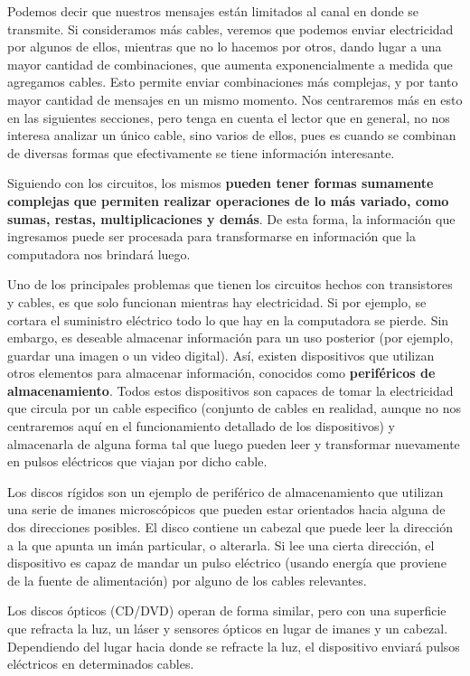 Podemos decir que nuestros mensajes están limitados al canal en donde se transmite.
Si consideramos más cables, veremos que podemos enviar electricidad por algunos
de ellos, mientras que no lo hacemos por otros, dando lugar a una mayor cantidad
de combinaciones, que aumenta exponencialmente a medida que agregamos cables. Esto
permite enviar combinaciones más complejas, y por tanto mayor cantidad de mensajes
en un mismo momento. Nos centraremos más en esto en las siguientes secciones, pero
tenga en cuenta el lector que en general, no nos interesa analizar un único cable,
sino varios de ellos, pues es cuando se combinan de diversas formas que efectivamente
se tiene información interesante. 

Siguiendo con los circuitos, los mismos \textbf{pueden tener formas sumamente
complejas que permiten realizar operaciones de lo más variado, como sumas,
restas, multiplicaciones y demás}. De esta forma, la información que ingresamos
puede ser procesada para transformarse en información que la computadora nos
brindará luego.\autocite[cap. 1]{nisan_2005}

Uno de los principales problemas que tienen los circuitos hechos con transistores
y cables, es que solo funcionan mientras hay electricidad. Si por ejemplo, se
cortara el suministro eléctrico todo lo que hay en la computadora se pierde.
Sin embargo, es deseable almacenar información para un uso posterior (por
ejemplo, guardar una imagen o un video digital). Así, existen dispositivos que
utilizan otros elementos para almacenar información, conocidos como
\textbf{periféricos de almacenamiento}. Todos estos dispositivos son capaces
de tomar la electricidad que circula por un cable especifico (conjunto de cables
en realidad, aunque no nos centraremos aquí en el funcionamiento detallado de
los dispositivos) y almacenarla de alguna forma tal que luego pueden leer y
transformar nuevamente en pulsos eléctricos que viajan por dicho cable.

Los discos rígidos son un ejemplo de periférico de almacenamiento que utilizan
una serie de imanes microscópicos que pueden estar orientados hacia alguna de
dos direcciones posibles. El disco contiene un cabezal que puede leer la
dirección a la que apunta un imán particular, o alterarla. Si lee una cierta
dirección, el dispositivo es capaz de mandar un pulso eléctrico (usando energía
que proviene de la fuente de alimentación) por alguno de los cables relevantes.

Los discos ópticos (CD/DVD) operan de forma similar, pero con una superficie
que refracta la luz, un láser y sensores ópticos en lugar de imanes y un
cabezal. Dependiendo del lugar hacia donde se refracte la luz, el dispositivo
enviará pulsos eléctricos en determinados cables.

